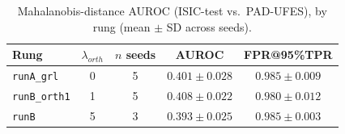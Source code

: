 \begin{table}[htbp]
\centering
\caption{Mahalanobis-distance AUROC (ISIC-test vs.\ PAD-UFES), by rung (mean $\pm$ SD across seeds).}
\label{tab:mahalanobis-auroc}
\begin{tabular}{lcccc}
\toprule
Rung & $\lambda_{orth}$ & $n$ seeds & AUROC & FPR@95\%TPR \\
\midrule
\texttt{runA\_grl}   & 0 & 5 & $0.401 \pm 0.028$ & $0.985 \pm 0.009$ \\
\texttt{runB\_orth1} & 1 & 5 & $0.408 \pm 0.022$ & $0.980 \pm 0.012$ \\
\texttt{runB}        & 5 & 3 & $0.393 \pm 0.025$ & $0.985 \pm 0.003$ \\
\bottomrule
\end{tabular}
\end{table}
